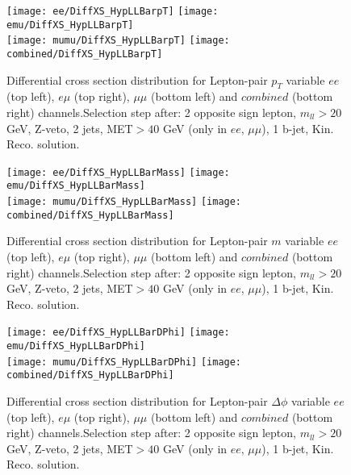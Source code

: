 \clearpage
\newpage


\begin{figure}
  \texttt{[image: ee/DiffXS\_HypLLBarpT]}
  \texttt{[image: emu/DiffXS\_HypLLBarpT]}\\
  \texttt{[image: mumu/DiffXS\_HypLLBarpT]}
  \texttt{[image: combined/DiffXS\_HypLLBarpT]}
\caption{Differential cross section distribution for  Lepton-pair $p_T$ variable  $ee$ (top left), $e\mu$ (top right), $\mu\mu$ (bottom left) and $combined$ (bottom right) channels.\newline Selection step after: 2 opposite sign lepton, $m_{ll}>20$ GeV, Z-veto, 2 jets, MET$>40$ GeV (only in $ee$, $\mu\mu$), 1 b-jet, Kin. Reco. solution.}
\end{figure}

\clearpage
\newpage


\begin{figure}
  \texttt{[image: ee/DiffXS\_HypLLBarMass]}
  \texttt{[image: emu/DiffXS\_HypLLBarMass]}\\
  \texttt{[image: mumu/DiffXS\_HypLLBarMass]}
  \texttt{[image: combined/DiffXS\_HypLLBarMass]}
\caption{Differential cross section distribution for  Lepton-pair $m$ variable  $ee$ (top left), $e\mu$ (top right), $\mu\mu$ (bottom left) and $combined$ (bottom right) channels.\newline Selection step after: 2 opposite sign lepton, $m_{ll}>20$ GeV, Z-veto, 2 jets, MET$>40$ GeV (only in $ee$, $\mu\mu$), 1 b-jet, Kin. Reco. solution.}
\end{figure}

\clearpage
\newpage

\begin{figure}
  \texttt{[image: ee/DiffXS\_HypLLBarDPhi]}
  \texttt{[image: emu/DiffXS\_HypLLBarDPhi]}\\
  \texttt{[image: mumu/DiffXS\_HypLLBarDPhi]}
  \texttt{[image: combined/DiffXS\_HypLLBarDPhi]}
\caption{Differential cross section distribution for  Lepton-pair $\Delta\phi$ variable  $ee$ (top left), $e\mu$ (top right), $\mu\mu$ (bottom left) and $combined$ (bottom right) channels.\newline Selection step after: 2 opposite sign lepton, $m_{ll}>20$ GeV, Z-veto, 2 jets, MET$>40$ GeV (only in $ee$, $\mu\mu$), 1 b-jet, Kin. Reco. solution.}
\end{figure}

